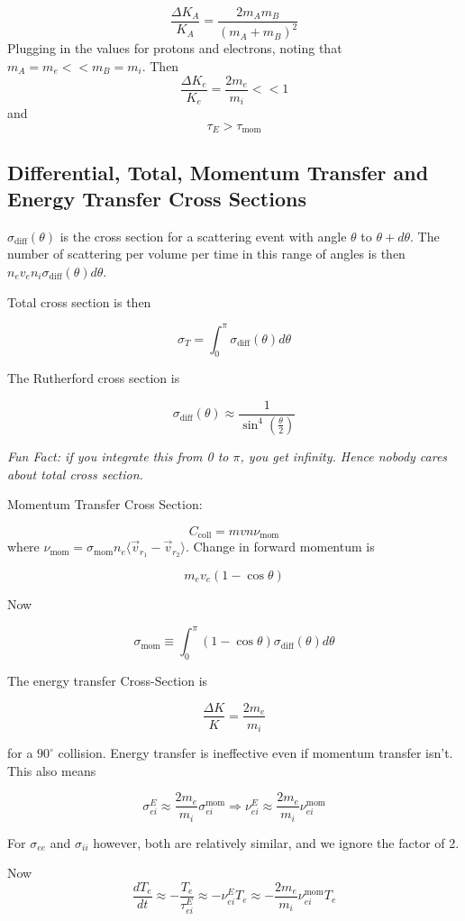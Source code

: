 \documentclass[12pt]{article}
\begin{document}
$$\frac{\Delta K_A}{K_A} = \frac{2m_Am_B}{(m_A+m_B)^2}$$
Plugging in the values for protons and electrons, noting that $m_A = m_e << m_B = m_i$. Then
$$\frac{\Delta K_e}{K_e} = \frac{2m_e}{m_i} << 1$$
and
$$\tau_E > \tau_{\text{mom}}$$

\subsection{Differential, Total, Momentum Transfer and Energy Transfer Cross Sections}

$\sigma_{\text{diff}}(\theta)$ is the cross section for a scattering event with angle $\theta$ to $\theta + d\theta$. The number of scattering per volume per time in this range of angles is then $n_ev_en_i\sigma_{\text{diff}}(\theta)d\theta$.

Total cross section is then

$$\sigma_T = \int_0^\pi \sigma_{\text{diff}}(\theta)d\theta$$

The Rutherford cross section is

$$\sigma_{\text{diff}}(\theta) \approx \frac{1}{\sin^4\left(\frac{\theta}{2}\right)}$$

\textit{Fun Fact: if you integrate this from 0 to $\pi$, you get infinity. Hence nobody cares about total cross section.}

Momentum Transfer Cross Section:

$$C_{\text{coll}} = mvn\nu_{\text{mom}}$$
where $\nu_{\text{mom}} = \sigma_{\text{mom}}n_e\langle \vec v_{r_1} - \vec v_{r_2} \rangle$. Change in forward momentum is

$$m_ev_e(1-\cos\theta)$$

Now

$$\sigma_{\text{mom}} \equiv \int_0^\pi (1 - \cos\theta)\sigma_{\text{diff}}(\theta)d\theta$$

The energy transfer Cross-Section is

$$\frac{\Delta K}{K} = \frac{2m_e}{m_i}$$

for a $90^\circ$ collision. Energy transfer is ineffective even if momentum transfer isn't. This also means

$$\sigma_{ei}^E \approx \frac{2m_e}{m_i} \sigma_{ei}^{\text{mom}} \Rightarrow \nu_{ei}^E \approx \frac{2m_e}{m_i} \nu_{ei}^{\text{mom}}$$

For $\sigma_{ee}$ and $\sigma_{ii}$ however, both are relatively similar, and we ignore the factor of 2.

\begin{ex}
    Now
    $$\frac{dT_e}{dt} \approx -\frac{T_e}{\tau_{ei}^E} \approx -\nu_{ei}^ET_e \approx -\frac{2m_e}{m_i} \nu_{ei}^{\text{mom}}T_e$$
\end{ex}
\end{document}
